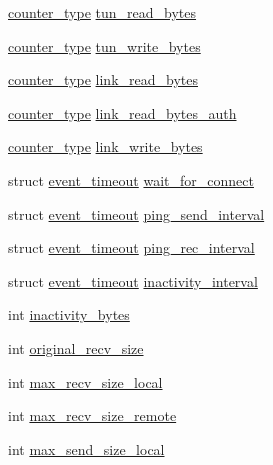 \begin{DoxyCompactItemize}
\item 
\hyperlink{common_8h_a00dd6fbfb368a41945c8c6b9d6fbf88f}{counter\+\_\+type} \hyperlink{structcontext__2_a3fe8f226d4b9bf0a3831ed6f6c81c38a}{tun\+\_\+read\+\_\+bytes}
\item 
\hyperlink{common_8h_a00dd6fbfb368a41945c8c6b9d6fbf88f}{counter\+\_\+type} \hyperlink{structcontext__2_aa3cc7c13e7812c3f71dba0bbdd46ff55}{tun\+\_\+write\+\_\+bytes}
\item 
\hyperlink{common_8h_a00dd6fbfb368a41945c8c6b9d6fbf88f}{counter\+\_\+type} \hyperlink{structcontext__2_a02884491547e765b2afe66a8006d34af}{link\+\_\+read\+\_\+bytes}
\item 
\hyperlink{common_8h_a00dd6fbfb368a41945c8c6b9d6fbf88f}{counter\+\_\+type} \hyperlink{structcontext__2_aae847f30748e65a5ed32f2ed2ba9183d}{link\+\_\+read\+\_\+bytes\+\_\+auth}
\item 
\hyperlink{common_8h_a00dd6fbfb368a41945c8c6b9d6fbf88f}{counter\+\_\+type} \hyperlink{structcontext__2_a07422cc25272851deb63bc6be1b65a10}{link\+\_\+write\+\_\+bytes}
\item 
struct \hyperlink{structevent__timeout}{event\+\_\+timeout} \hyperlink{structcontext__2_a6e148857a12de912aef0d3476a85baea}{wait\+\_\+for\+\_\+connect}
\item 
struct \hyperlink{structevent__timeout}{event\+\_\+timeout} \hyperlink{structcontext__2_a32c2fe431b3437e963b149780188174f}{ping\+\_\+send\+\_\+interval}
\item 
struct \hyperlink{structevent__timeout}{event\+\_\+timeout} \hyperlink{structcontext__2_af7d86fdde3cc1792be2bd85e735a2676}{ping\+\_\+rec\+\_\+interval}
\item 
struct \hyperlink{structevent__timeout}{event\+\_\+timeout} \hyperlink{structcontext__2_aee3f1b158710abd4c3020369b56b9f7a}{inactivity\+\_\+interval}
\item 
int \hyperlink{structcontext__2_a75335b0f54178e487959fcc0b5a367b6}{inactivity\+\_\+bytes}
\item 
int \hyperlink{structcontext__2_ac9926addf1893f11231488eb40adbd9f}{original\+\_\+recv\+\_\+size}
\item 
int \hyperlink{structcontext__2_a1bf11f368d7066c0f4b559c2c5cc7e49}{max\+\_\+recv\+\_\+size\+\_\+local}
\item 
int \hyperlink{structcontext__2_a2745ac1d99418d4d63fbf47dcc10002e}{max\+\_\+recv\+\_\+size\+\_\+remote}
\item 
int \hyperlink{structcontext__2_a32d4e1ea0d13c6b309c33c186b4b5c4a}{max\+\_\+send\+\_\+size\+\_\+local}
\item 

\end{DoxyCompactItemize}
